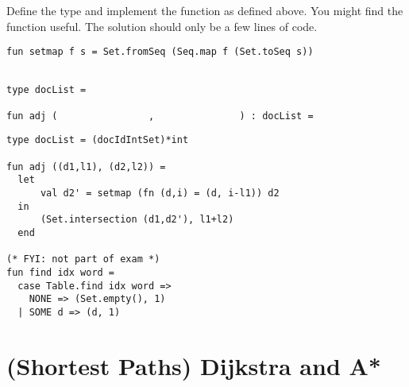 \begin{problem}[8p]


\ask
Define the  type and implement the function  as defined above.
You might find the function  useful. The solution should
only be a few lines of code.
\begin{lstlisting}[numbers=none]
fun setmap f s = Set.fromSeq (Seq.map f (Set.toSeq s)) 
\end{lstlisting}


\begin{lstlisting}[numbers=none]

type docList = 

fun adj (                ,               ) : docList =

\end{lstlisting}


\sol
\begin{lstlisting}[numbers=none]
type docList = (docIdIntSet)*int

fun adj ((d1,l1), (d2,l2)) = 
  let 
      val d2' = setmap (fn (d,i) = (d, i-l1)) d2
  in  
      (Set.intersection (d1,d2'), l1+l2)
  end

(* FYI: not part of exam *)
fun find idx word = 
  case Table.find idx word =>
    NONE => (Set.empty(), 1)
  | SOME d => (d, 1)
\end{lstlisting}
   
\end{problem}



\section{(Shortest Paths) Dijkstra and A*}
%


